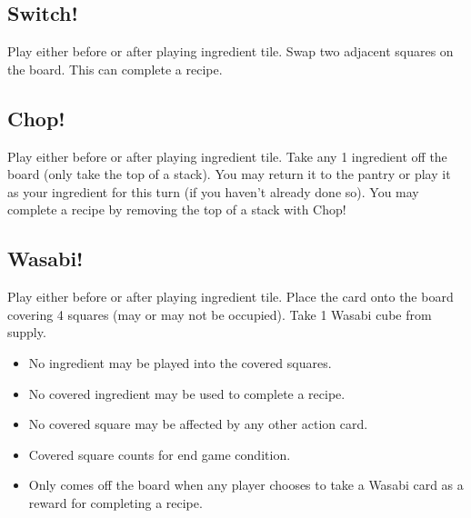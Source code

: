 \documentclass[12pt]{article}
\newenvironment{itemizeCustom}
{\begin{itemize}
  \setlength{\itemsep}{1pt}
  \setlength{\parskip}{0pt}
  \setlength{\parsep}{0pt}}
{\end{itemize}}
\begin{document}
\begin{mdframed}[style = customFrame]
\begin{multicols*}{2}
\subsection*{Switch!}
Play either before or after playing ingredient tile. Swap two adjacent squares on the board. This can complete a recipe.

\subsection*{Chop!}
Play either before or after playing ingredient tile. Take any 1 ingredient off the board (only take the top of a stack). You may return it to the pantry or play it as your ingredient for this turn (if you haven't already done so). You may complete a recipe by removing the top of a stack with Chop!

\subsection*{Wasabi!}
Play either before or after playing ingredient tile. Place the card onto the board covering 4 squares (may or may not be occupied). Take 1 Wasabi cube from supply.
\begin{itemizeCustom}
    \item No ingredient may be played into the covered squares.
    \item No covered ingredient may be used to complete a recipe.
    \item No covered square may be affected by any other action card.
    \item Covered square counts for end game condition.
    \item Only comes off the board when any player chooses to take a Wasabi card as a reward for completing a recipe.
\end{itemizeCustom}

\end{multicols*}
\end{mdframed}
\end{document}
